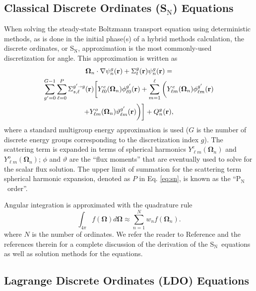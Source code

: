 \documentclass{article} %
\newcommand{\bo}{\mathbf\Omega}
\newcommand{\vecr}{\textbf{r}}
\newcommand{\sn}{S$_\mathrm{N}$}
\newcommand{\pn}{P$_\mathrm{N}$}
\newcommand{\Ye}[2]{\ensuremath{Y^e_{#1}(\bo_#2)}}
\newcommand{\Yo}[2]{\ensuremath{Y^o_{#1}(\bo_#2)}}
\newcommand{\sa}{\shortrightarrow}
\begin{document}
\subsection{Classical Discrete Ordinates (\sn) Equations}

When solving the steady-state Boltzmann transport equation using deterministic
methods, as is done in the initial phase(s) of a hybrid methods calculation, the
discrete ordinates, or \sn, approximation is the most commonly-used
discretization for angle. This approximation is written as
%
\begin{multline}
\bo_n \cdot \nabla \psi_n^g(\vecr) + \Sigma_t^g(\vecr)\psi_n^g(\vecr) = \\
\sum_{g'=0}^{G-1}\sum_{\ell=0}^{P}\Sigma_{s,\ell}^{g'\sa g}(\vecr)
\bigg[\Ye{\ell 0}{n}\phi_{\ell 0}^{g'}(\vecr) + \sum_{m=1}^{\ell}
\bigg(\Ye{\ell m}{n}\phi_{\ell m}^{g'}(\vecr) \\
 + \Yo{\ell m}{n}\vartheta_{\ell m}^{g'}(\vecr)\bigg)\bigg]
+ Q_n^g(\vecr),
\label{eq:sn}
\end{multline}
%
where a standard multigroup energy approximation is used ($G$ is the
number of discrete energy groups corresponding to the discretization index
$g$). The scattering term is expanded in terms of spherical harmonics
$\Ye{\ell m}{n}$ and $\Yo{\ell m}{n}$; $\phi$ and $\vartheta$ are the
``flux moments'' that are eventually used to  solve for the scalar flux
solution. The upper limit of summation for the scattering term spherical
harmonic expansion, denoted as $P$ in Eq. \eqref{eq:sn}, is known as the
``\pn\ order''.

Angular integration is approximated with the quadrature rule 
%
\begin{equation}
\int_{4\pi} f\left(\bo\right) d\bo \approx \sum_{n=1}^{N}w_n f\left(\bo_n\right).
\label{eq:quadrule}
\end{equation}
%
where $N$ is the number of ordinates. We refer the reader to Reference
\cite{denovo} and the references therein for a complete discussion of the
derivation of the \sn\ equations as well as solution methods for the equations.

\subsection{Lagrange Discrete Ordinates (LDO) Equations}
\end{document}
